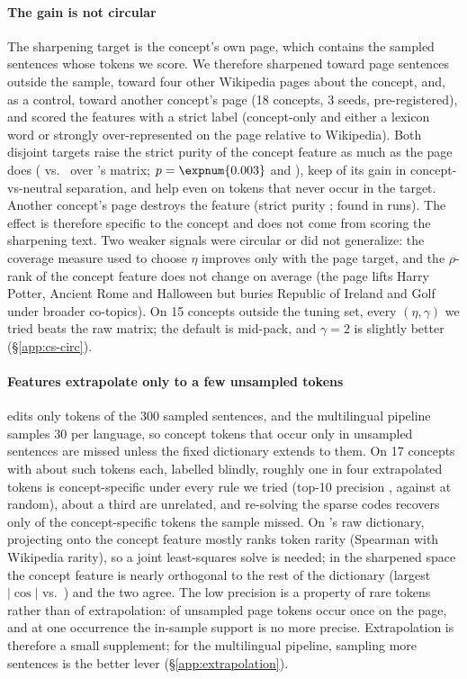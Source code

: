 \paragraph{The gain is not circular}
The sharpening target is the concept's own page, which contains the sampled sentences whose tokens we score.
We therefore sharpened toward page sentences outside the sample, toward four other Wikipedia pages about the concept, and, as a control, toward another concept's page (18 concepts, 3 seeds, pre-registered), and scored the features with a strict label (concept-only and either a lexicon word or strongly over-represented on the page relative to Wikipedia).
Both disjoint targets raise the strict purity of the concept feature as much as the page does ( vs.\  over \ember{}'s matrix; $p = \expnum{0.003}$ and ), keep  of its gain in concept-vs-neutral separation, and help even on tokens that never occur in the target.
Another concept's page destroys the feature (strict purity ; found in  runs).
The effect is therefore specific to the concept and does not come from scoring the sharpening text.
Two weaker signals were circular or did not generalize: the coverage measure used to choose $\eta$ improves only with the page target, and the $\rho$-rank of the concept feature does not change on average (the page lifts Harry Potter, Ancient Rome and Halloween but buries Republic of Ireland and Golf under broader co-topics).
On 15 concepts outside the tuning set, every $(\eta, \gamma)$ we tried beats the raw matrix; the default is mid-pack, and $\gamma = 2$ is slightly better (\S\ref{app:cs-circ}).

\paragraph{Features extrapolate only to a few unsampled tokens}
\ember{} edits only tokens of the 300 sampled sentences, and the multilingual pipeline samples 30 per language, so concept tokens that occur only in unsampled sentences are missed unless the fixed dictionary extends to them.
On 17 concepts with about  such tokens each, labelled blindly, roughly one in four extrapolated tokens is concept-specific under every rule we tried (top-10 precision , against  at random), about a third are unrelated, and re-solving the sparse codes recovers only  of the concept-specific tokens the sample missed.
On \ember{}'s raw dictionary, projecting onto the concept feature mostly ranks token rarity (Spearman  with Wikipedia rarity), so a joint least-squares solve is needed; in the sharpened space the concept feature is nearly orthogonal to the rest of the dictionary (largest $|\cos|$  vs.\ ) and the two agree.
The low precision is a property of rare tokens rather than of extrapolation:  of unsampled page tokens occur once on the page, and at one occurrence the in-sample support is no more precise.
Extrapolation is therefore a small supplement; for the multilingual pipeline, sampling more sentences is the better lever (\S\ref{app:extrapolation}).

